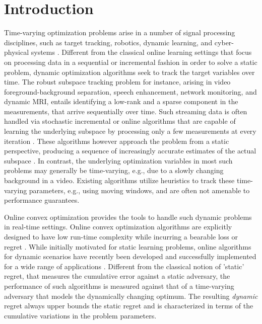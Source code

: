 \documentclass[draftcls,onecolumn,12pt]{IEEEtran}
\theoremstyle{plain}
\theoremstyle{plain}
\theoremstyle{remark}
\begin{document}
	\section{ Introduction}
	Time-varying optimization problems arise in a number of signal processing disciplines, such as target tracking, robotics, dynamic learning, and cyber-physical systems \cite{derenick2009optimal,mokhtari2016online,6293884}. Different from the classical online learning settings that focus on processing data in a sequential or incremental fashion in order to solve a static problem, dynamic optimization algorithms seek to track the target variables over time. The robust subspace tracking problem for instance, arising in video foreground-background separation, speech enhancement, network monitoring, and dynamic MRI, entails identifying a low-rank and a sparse component in the measurements, that arrive sequentially over time. Such streaming data is often handled via stochastic incremental or online algorithms that are capable of learning the underlying subspace by processing only a few measurements at every iteration \cite{feng2013online, lois2015online, bouwmans2014robust, he2011online}. These algorithms however approach the problem from a static perspective, producing a sequence of increasingly accurate estimates of the actual subspace \cite{reprocs, wang2012probabilistic}. In contrast, the underlying optimization variables in most such problems may generally be time-varying, e.g., due to a slowly changing background in a video. Existing algorithms utilize heuristics to track these time-varying parameters, e.g., using moving windows, and are often not amenable to performance guarantees. 
	
	Online convex optimization provides the tools to handle such dynamic problems in real-time settings. Online convex optimization algorithms are explicitly designed to have low run-time complexity while incurring a bearable loss or regret \cite{zinkevich2003online}. While initially motivated for static learning problems, online algorithms for dynamic scenarios have recently been developed and successfully implemented for a wide range of applications \cite{hall2015online, zhang2016improved, simonetto2015non, shahrampour2018distributed,pmlr-v38-jadbabaie15}. Different from the classical notion of 'static' regret, that measures the cumulative error against a static adversary, the performance of such algorithms is measured against that of a time-varying adversary that models the dynamically changing optimum. The resulting \emph{dynamic} regret always upper bounds the static regret and is characterized in terms of the cumulative variations in the problem parameters.
	
\end{document}
